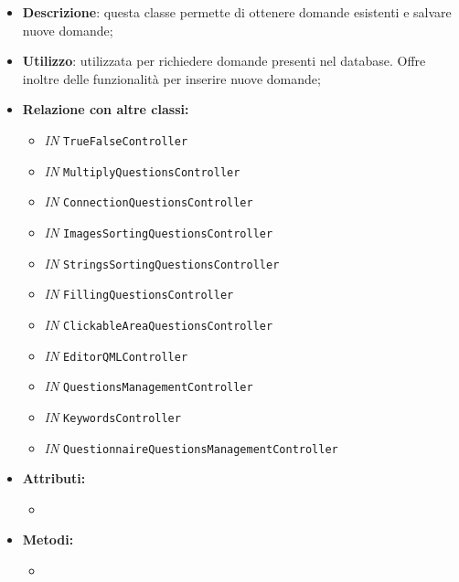 \begin{itemize}
	\item \textbf{Descrizione}: questa classe permette di ottenere domande esistenti e salvare nuove domande;
	\item \textbf{Utilizzo}: utilizzata per richiedere domande presenti nel database. Offre inoltre delle funzionalità per inserire nuove domande;
	\item \textbf{Relazione con altre classi:}
	\begin{itemize}
		\item \textit{IN} \texttt{TrueFalseController} 
		\item \textit{IN} \texttt{MultiplyQuestionsController} 
		\item \textit{IN} \texttt{ConnectionQuestionsController} 
		\item \textit{IN} \texttt{ImagesSortingQuestionsController} 
		\item \textit{IN} \texttt{StringsSortingQuestionsController} 
		\item \textit{IN} \texttt{FillingQuestionsController} 
		\item \textit{IN} \texttt{ClickableAreaQuestionsController} 
		\item \textit{IN} \texttt{EditorQMLController} 
		\item \textit{IN} \texttt{QuestionsManagementController} 
		\item \textit{IN} \texttt{KeywordsController} 
		\item \textit{IN} \texttt{QuestionnaireQuestionsManagementController} 
		
	\end{itemize}
	\item \textbf{Attributi:}
	\begin{itemize}
		\item 
	\end{itemize}
	\item \textbf{Metodi:}
	\begin{itemize}
		\item 
	\end{itemize}
\end{itemize}

